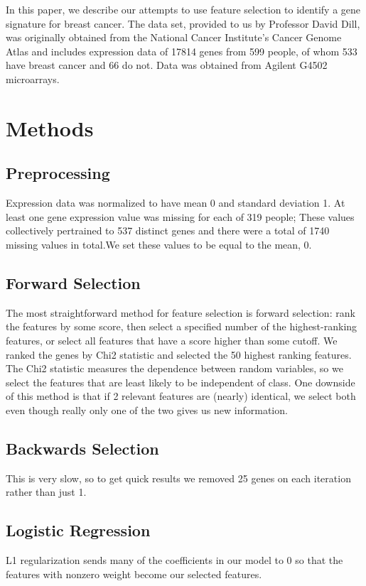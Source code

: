\documentclass[10.75pt]{article}
\begin{document}
In this paper, we describe our attempts to use feature selection to identify a gene signature for breast cancer. The data set, provided to us by Professor David Dill, was originally obtained from the National Cancer Institute's Cancer Genome Atlas and includes expression data of 17814 genes from 599 people, of whom 533 have breast cancer and 66 do not. Data was obtained from Agilent G4502 microarrays. 

\section{Methods}
\setcounter{subsection}{-1} %
\subsection{Preprocessing} 
Expression data was normalized to have mean 0 and standard deviation 1. At least one gene expression value was missing for each of 319 people; These values collectively pertrained to 537 distinct genes and there were a total of 1740 missing values in total.We set these values to be equal to the mean, 0. 

\subsection{Forward Selection}
The most straightforward method for feature selection is forward selection: rank the features by some score, then select a specified number of the highest-ranking features, or select all features that have a score higher than some cutoff. We ranked the genes by Chi2 statistic and selected the 50 highest ranking features. The Chi2 statistic measures the dependence between random variables, so we select the features that are least likely to be independent of class. One downside of this method is that if 2 relevant features are (nearly) identical, we select both even though really only one of the two gives us new information.

\subsection{Backwards Selection}
This is very slow, so to get quick results we removed 25 genes on each iteration rather than just 1.

\subsection{Logistic Regression}
L1 regularization sends many of the coefficients in our model to 0 so that the features with nonzero weight become our selected features.
\end{document}
